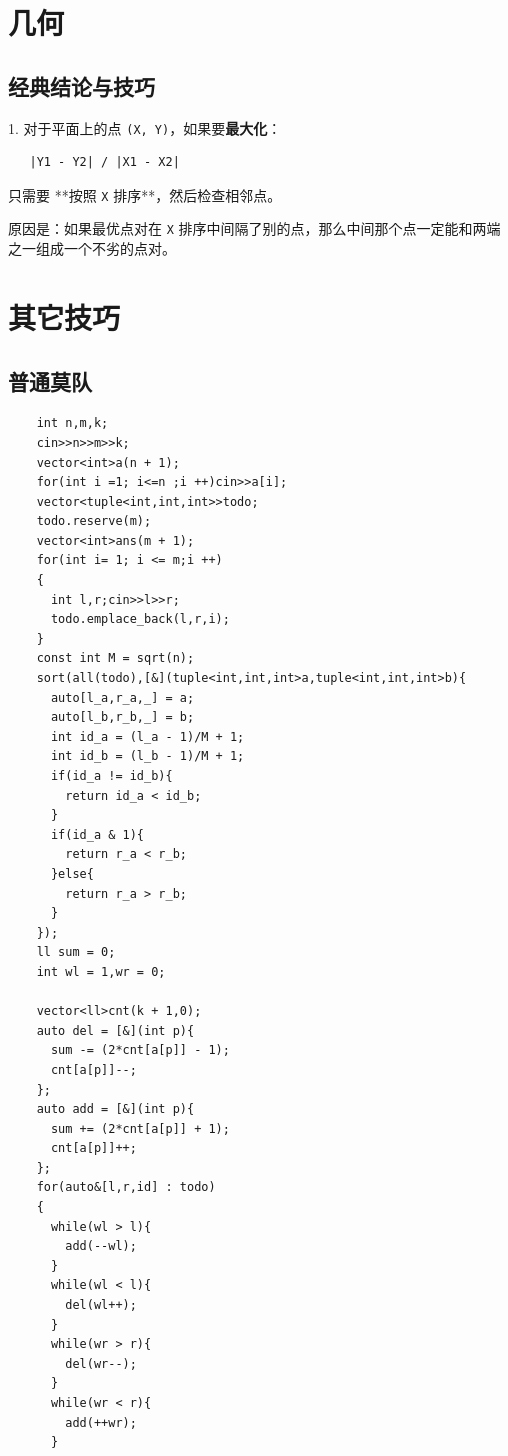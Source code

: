 \documentclass[10pt]{article}
\begin{document}
\begin{multicols*}{2}
\section{几何}


\subsection{经典结论与技巧}


1. 对于平面上的点 \texttt{(X, Y)}，如果要\textbf{最大化}： \par

\begin{verbatim}
   |Y1 - Y2| / |X1 - X2|
\end{verbatim}


只需要 **按照 \texttt{X} 排序**，然后检查相邻点。 \par

原因是：如果最优点对在 \texttt{X} 排序中间隔了别的点，那么中间那个点一定能和两端之一组成一个不劣的点对。 \par

\section{其它技巧}


\subsection{普通莫队}


\begin{verbatim}
    int n,m,k;
    cin>>n>>m>>k;
    vector<int>a(n + 1);
    for(int i =1; i<=n ;i ++)cin>>a[i];
    vector<tuple<int,int,int>>todo;
    todo.reserve(m);
    vector<int>ans(m + 1);
    for(int i= 1; i <= m;i ++)
    {
      int l,r;cin>>l>>r;
      todo.emplace_back(l,r,i);
    }
    const int M = sqrt(n);
    sort(all(todo),[&](tuple<int,int,int>a,tuple<int,int,int>b){
      auto[l_a,r_a,_] = a;
      auto[l_b,r_b,_] = b;
      int id_a = (l_a - 1)/M + 1;
      int id_b = (l_b - 1)/M + 1;
      if(id_a != id_b){
        return id_a < id_b;
      }
      if(id_a & 1){
        return r_a < r_b;
      }else{
        return r_a > r_b;
      }
    });
    ll sum = 0;
    int wl = 1,wr = 0;

    vector<ll>cnt(k + 1,0);
    auto del = [&](int p){
      sum -= (2*cnt[a[p]] - 1);
      cnt[a[p]]--;
    };
    auto add = [&](int p){
      sum += (2*cnt[a[p]] + 1);
      cnt[a[p]]++;
    };
    for(auto&[l,r,id] : todo)
    {
      while(wl > l){
        add(--wl);
      }
      while(wl < l){
        del(wl++);
      }
      while(wr > r){
        del(wr--);
      }
      while(wr < r){
        add(++wr);
      }
      

\end{verbatim}
\end{multicols*}
\end{document}
